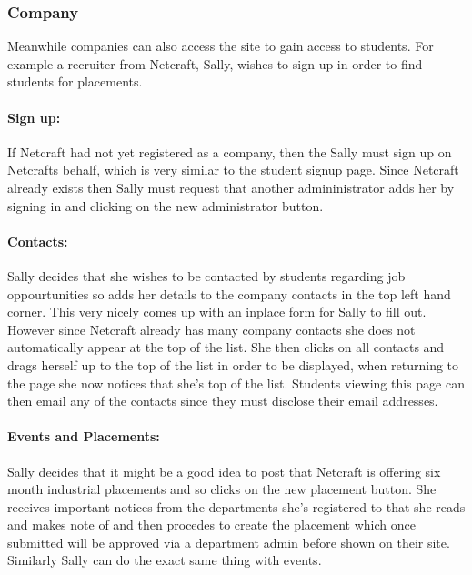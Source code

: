 \subsubsection{Company}
Meanwhile companies can also access the site to gain access to students. For example a recruiter from Netcraft, Sally, wishes to sign up in order to find students for placements.
  \paragraph{Sign up:}
    If Netcraft had not yet registered as a company, then the Sally must sign up on Netcrafts behalf, which is very similar to the student signup page.
    Since Netcraft already exists then Sally must request that another admininistrator adds her by signing in and clicking on the new administrator button.

  \paragraph{Contacts:}
    Sally decides that she wishes to be contacted by students regarding job oppourtunities so adds her details to the company contacts in the top left hand corner. This very nicely comes up with an inplace form for Sally to fill out. However since Netcraft already has many company contacts she does not automatically appear at the top of the list. 
    She then clicks on all contacts and drags herself up to the top of the list in order to be displayed, when returning to the page she now notices that she's top of the list.
    Students viewing this page can then email any of the contacts since they must disclose their email addresses.

  \paragraph{Events and Placements:}
    Sally decides that it might be a good idea to post that Netcraft is offering six month industrial placements and so clicks on the new placement button. 
    She receives important notices from the departments she's registered to that she reads and makes note of and then procedes to create the placement which once submitted will be approved via a department admin before shown on their site.
    Similarly Sally can do the exact same thing with events.
  
